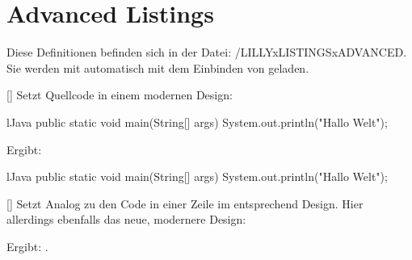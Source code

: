 \section{Advanced Listings}

Diese Definitionen befinden sich in der Datei: {\ltt{}/LILLYxLISTINGSxADVANCED}. Sie werden mit  automatisch mit dem Einbinden von  geladen.

[]
Setzt Quellcode in einem modernen Design:
\begin{latex}
\begin{presentlst}{lJava}
public static void main(String[] args) {
    System.out.println("Hallo Welt");
}
\end{presentlst}
\end{latex}
Ergibt:
\begin{presentlst}{lJava}
public static void main(String[] args) {
    System.out.println("Hallo Welt");
}
\end{presentlst}

[]
Setzt Analog zu  den Code in einer Zeile im entsprechend Design. Hier allerdings ebenfalls das neue, modernere Design: 
\begin{latex}
\end{latex}
Ergibt: .



% 
% 






